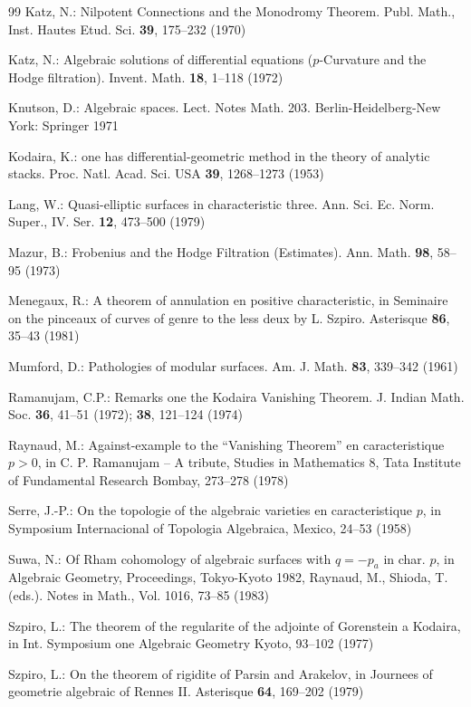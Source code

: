 \documentclass[12pt,a4paper]{article}
\theoremstyle{plain}
\theoremstyle{definition}
\theoremstyle{remark}
\begin{document}
\begin{thebibliography}{99}
 Katz, N.: Nilpotent Connections and the Monodromy Theorem. Publ. Math., Inst. Hautes Etud. Sci. \textbf{39}, 175--232 (1970)

 Katz, N.: Algebraic solutions of differential equations ($p$-Curvature and the Hodge filtration). Invent. Math. \textbf{18}, 1--118 (1972)

 Knutson, D.: Algebraic spaces. Lect. Notes Math. 203. Berlin-Heidelberg-New York: Springer 1971

 Kodaira, K.: one has differential-geometric method in the theory of analytic stacks. Proc. Natl. Acad. Sci. USA \textbf{39}, 1268--1273 (1953)

 Lang, W.: Quasi-elliptic surfaces in characteristic three. Ann. Sci. Ec. Norm. Super., IV. Ser. \textbf{12}, 473--500 (1979)

 Mazur, B.: Frobenius and the Hodge Filtration (Estimates). Ann. Math. \textbf{98}, 58--95 (1973)

 Menegaux, R.: A theorem of annulation en positive characteristic, in Seminaire on the pinceaux of curves of genre to the less deux by L. Szpiro. Asterisque \textbf{86}, 35--43 (1981)

 Mumford, D.: Pathologies of modular surfaces. Am. J. Math. \textbf{83}, 339--342 (1961)

 Ramanujam, C.P.: Remarks one the Kodaira Vanishing Theorem. J. Indian Math. Soc. \textbf{36}, 41--51 (1972); \textbf{38}, 121--124 (1974)

 Raynaud, M.: Against-example to the ``Vanishing Theorem'' en caracteristique $p > 0$, in C. P. Ramanujam -- A tribute, Studies in Mathematics 8, Tata Institute of Fundamental Research Bombay, 273--278 (1978)

 Serre, J.-P.: On the topologie of the algebraic varieties en caracteristique $p$, in Symposium Internacional of Topologia Algebraica, Mexico, 24--53 (1958)

 Suwa, N.: Of Rham cohomology of algebraic surfaces with $q = -p_a$ in char. $p$, in Algebraic Geometry, Proceedings, Tokyo-Kyoto 1982, Raynaud, M., Shioda, T. (eds.). Notes in Math., Vol. 1016, 73--85 (1983)

 Szpiro, L.: The theorem of the regularite of the adjointe of Gorenstein a Kodaira, in Int. Symposium one Algebraic Geometry Kyoto, 93--102 (1977)

 Szpiro, L.: On the theorem of rigidite of Parsin and Arakelov, in Journees of geometrie algebraic of Rennes II. Asterisque \textbf{64}, 169--202 (1979)

\end{thebibliography}
\end{document}
